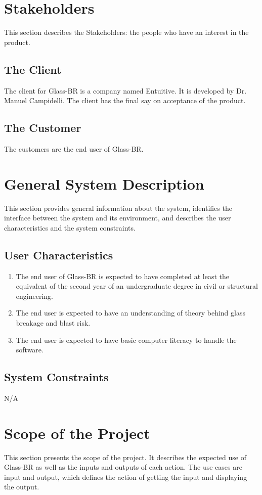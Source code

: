 \documentclass[12pt]{article}
\begin{document}
\section{Stakeholders}
\label{Sec:S}
This section describes the Stakeholders: the people who have an interest in the product.
\subsection{The Client}
\label{Sec:TC}
The client for Glass-BR is a company named Entuitive. It is developed by Dr. Manuel Campidelli. The client has the final say on acceptance of the product.
\subsection{The Customer}
\label{Sec:TC}
The customers are the end user of Glass-BR.
\section{General System Description}
\label{Sec:GSD}
This section provides general information about the system, identifies the interface between the system and its environment, and describes the user characteristics and the system constraints.
\subsection{User Characteristics}
\label{Sec:UC}
\begin{enumerate}
\item{The end user of Glass-BR is expected to have completed at least the equivalent of the second year of an undergraduate degree in civil or structural engineering.}
\item{The end user is expected to have an understanding of theory behind glass breakage and blast risk.}
\item{The end user is expected to have basic computer literacy to handle the software.}
\end{enumerate}
\subsection{System Constraints}
\label{Sec:SC}
N/A
\section{Scope of the Project}
\label{Sec:SotP}
This section presents the scope of the project. It describes the expected use of Glass-BR as well as the inputs and outputs of each action. The use cases are input and output, which defines the action of getting the input and displaying the output.
\end{document}
